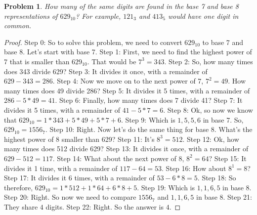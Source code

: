 \documentclass{article}
\newtheorem{theorem}{Problem}
\begin{document}
\begin{theorem}
How many of the same digits are found in the base 7 and base 8 representations of $629_{10}$? For example, $121_{3}$ and $413_{5}$ would have one digit in common.
\end{theorem}

\begin{proof}
Step 0: So to solve this problem, we need to convert $629_{10}$ to base 7 and base 8. Let's start with base 7.
Step 1: First, we need to find the highest power of 7 that is smaller than $629_{10}$. That would be $7^3=343$.
Step 2: So, how many times does 343 divide 629?
Step 3: It divides it once, with a remainder of $629-343=286$.
Step 4: Now we move on to the next power of 7, $7^2=49$. How many times does 49 divide 286?
Step 5: It divides it 5 times, with a remainder of $286-5*49=41$.
Step 6: Finally, how many times does 7 divide 41?
Step 7: It divides it 5 times, with a remainder of $41-5*7=6$.
Step 8: Ok, so now we know that $629_{10}=1*343+5*49+5*7+6$.
Step 9: Which is $1,5,5,6$ in base 7. So, $629_{10}=1556_7$.
Step 10: Right. Now let's do the same thing for base 8. What's the highest power of 8 smaller than 629?
Step 11: It's $8^3=512$.
Step 12: Ok, how many times does 512 divide 629?
Step 13: It divides it once, with a remainder of $629-512=117$.
Step 14: What about the next power of 8, $8^2=64$?
Step 15: It divides it 1 time, with a remainder of $117-64=53$.
Step 16: How about $8^1=8$?
Step 17: It divides it 6 times, with a remainder of $53-6*8=5$.
Step 18: So therefore, $629_{10}=1*512+1*64+6*8+5$.
Step 19: Which is $1,1,6,5$ in base 8.
Step 20: Right. So now we need to compare $1556_7$ and $1,1,6,5$ in base 8.
Step 21: They share $4$ digits.
Step 22: Right. So the answer is $4$.
\end{proof}
\end{document}
